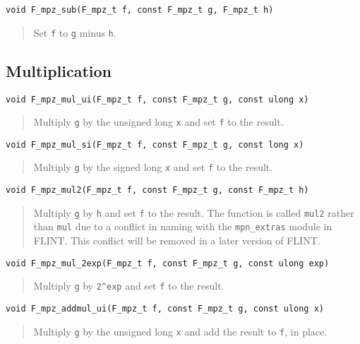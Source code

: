 \documentclass[a4paper,10pt]{article}
\newcommand{\code}{\lstinline}
\begin{document}
\begin{lstlisting}
void F_mpz_sub(F_mpz_t f, const F_mpz_t g, F_mpz_t h)
\end{lstlisting}
\begin{quote}
Set \code{f} to \code{g} minus \code{h}. 
\end{quote}

\subsection{Multiplication}

\begin{lstlisting}
void F_mpz_mul_ui(F_mpz_t f, const F_mpz_t g, const ulong x)
\end{lstlisting}
\begin{quote}
Multiply \code{g} by the unsigned long \code{x} and set \code{f} to the result.
\end{quote}

\begin{lstlisting}
void F_mpz_mul_si(F_mpz_t f, const F_mpz_t g, const long x)
\end{lstlisting}
\begin{quote}
Multiply \code{g} by the signed long \code{x} and set \code{f} to the result.
\end{quote}

\begin{lstlisting}
void F_mpz_mul2(F_mpz_t f, const F_mpz_t g, const F_mpz_t h)
\end{lstlisting}
\begin{quote}
Multiply \code{g} by \code{h} and set \code{f} to the result. The function is called \code{mul2} rather than \code{mul} due to a conflict in naming with the \code{mpn_extras} module in FLINT. This conflict will be removed in a later version of FLINT.
\end{quote}

\begin{lstlisting}
void F_mpz_mul_2exp(F_mpz_t f, const F_mpz_t g, const ulong exp)
\end{lstlisting}
\begin{quote}
Multiply \code{g} by \code{2^exp} and set \code{f} to the result.
\end{quote}

\begin{lstlisting}
void F_mpz_addmul_ui(F_mpz_t f, const F_mpz_t g, const ulong x)
\end{lstlisting}
\begin{quote}
Multiply \code{g} by the unsigned long \code{x} and add the result to \code{f}, in place.
\end{quote}
\end{document}
